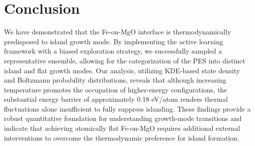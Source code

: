 \section{Conclusion}

We have demonstrated that the Fe-on-MgO interface is thermodynamically predisposed to island growth mode. By implementing the active learning framework with a biased exploration strategy, we successfully sampled a representative ensemble, allowing for the categorization of the PES into distinct island and flat growth modes. Our analysis, utilizing KDE-based state density and Boltzmann probability distributions, reveals that although increasing temperature promotes the occupation of higher-energy configurations, the substantial energy barrier of approximately 0.18 eV/atom renders thermal fluctuations alone insufficient to fully suppress islanding. These findings provide a robust quantitative foundation for understanding growth-mode transitions and indicate that achieving atomically flat Fe-on-MgO requires additional external interventions to overcome the thermodynamic preference for island formation.